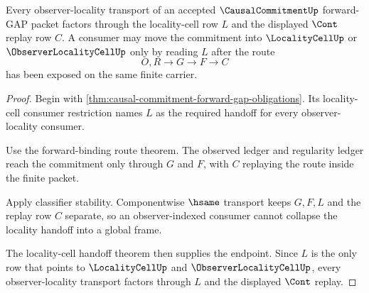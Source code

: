 \begin{theorem}
\label{thm:causal-commitment-locality-transport}
Every observer-locality transport of an accepted $\CausalCommitmentUp$ forward-GAP packet factors through the locality-cell row $L$ and the displayed $\Cont$ replay row $C$. A consumer may move the commitment into $\LocalityCellUp$ or $\ObserverLocalityCellUp$ only by reading $L$ after the route
$$
O,R \longrightarrow G \longrightarrow F \longrightarrow C
$$
has been exposed on the same finite carrier.
\end{theorem}
\begin{proof}
Begin with \autoref{thm:causal-commitment-forward-gap-obligations}. Its locality-cell consumer restriction names $L$ as the required handoff for every observer-locality consumer.

Use the forward-binding route theorem. The observed ledger and regularity ledger reach the commitment only through $G$ and $F$, with $C$ replaying the route inside the finite packet.

Apply classifier stability. Componentwise $\hsame$ transport keeps $G,F,L$ and the replay row $C$ separate, so an observer-indexed consumer cannot collapse the locality handoff into a global frame.

The locality-cell handoff theorem then supplies the endpoint. Since $L$ is the only row that points to $\LocalityCellUp$ and $\ObserverLocalityCellUp$, every observer-locality transport factors through $L$ and the displayed $\Cont$ replay.
\end{proof}


